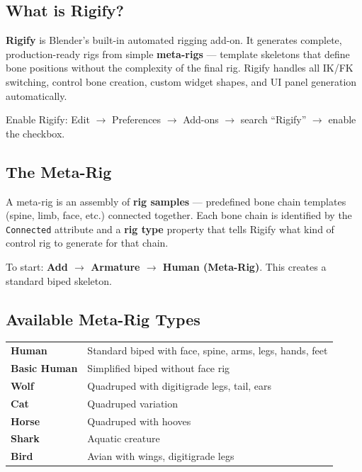 \subsection{What is Rigify?}

\textbf{Rigify} is Blender's built-in automated rigging add-on. It generates complete, production-ready rigs from simple \textbf{meta-rigs} --- template skeletons that define bone positions without the complexity of the final rig. Rigify handles all IK/FK switching, control bone creation, custom widget shapes, and UI panel generation automatically.

Enable Rigify: Edit $\rightarrow$ Preferences $\rightarrow$ Add-ons $\rightarrow$ search ``Rigify'' $\rightarrow$ enable the checkbox.

\subsection{The Meta-Rig}

A meta-rig is an assembly of \textbf{rig samples} --- predefined bone chain templates (spine, limb, face, etc.) connected together. Each bone chain is identified by the \texttt{Connected} attribute and a \textbf{rig type} property that tells Rigify what kind of control rig to generate for that chain.

To start: \textbf{Add $\rightarrow$ Armature $\rightarrow$ Human (Meta-Rig)}. This creates a standard biped skeleton.

\subsection{Available Meta-Rig Types}

\begin{center}
\begin{tabularx}{\textwidth}{L{3cm}X}
\toprule
{}
 &  \\
\midrule
\textbf{Human} & Standard biped with face, spine, arms, legs, hands, feet \\
\textbf{Basic Human} & Simplified biped without face rig \\
\textbf{Wolf} & Quadruped with digitigrade legs, tail, ears \\
\textbf{Cat} & Quadruped variation \\
\textbf{Horse} & Quadruped with hooves \\
\textbf{Shark} & Aquatic creature \\
\textbf{Bird} & Avian with wings, digitigrade legs \\
\bottomrule
\end{tabularx}
\end{center}

